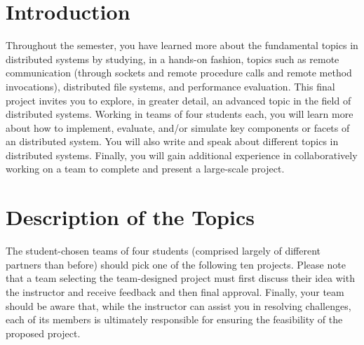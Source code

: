 

\usepackage[compact]{titlesec}


\section*{Introduction}

Throughout the semester, you have learned more about the fundamental topics in distributed systems by studying, in a
hands-on fashion, topics such as remote communication (through sockets and remote procedure calls and remote method
invocations), distributed file systems, and performance evaluation. This final project invites you to explore, in
greater detail, an advanced topic in the field of distributed systems. Working in teams of four students each, you will
learn more about how to implement, evaluate, and/or simulate key components or facets of an distributed system. You will
also write and speak about different topics in distributed systems.  Finally, you will gain additional experience in
collaboratively working on a team to complete and present a large-scale project.

\section*{Description of the Topics}

The student-chosen teams of four students (comprised largely of different partners than before) should pick one of the
following ten projects.  Please note that a team selecting the team-designed project must first discuss their idea with
the instructor and receive feedback and then final approval. Finally, your team should be aware that, while the
instructor can assist you in resolving challenges, each of its members is ultimately responsible for ensuring the
feasibility of the proposed project.

